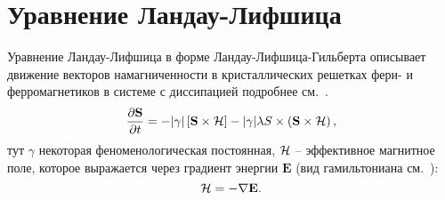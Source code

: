 \section{Уравнение Ландау-Лифшица}

Уравнение Ландау-Лифшица в форме Ландау-Лифшица-Гильберта описывает движение
векторов намагниченности в кристаллических решетках фери- и ферромагнетиков в
системе с диссипацией подробнее см.~\cite{lan-lif-again}.
\begin{equation}\label{eq:lan-lif-full}
    \frac{\partial \mathbf{S}}{\partial t} = - |\gamma|\left[\mathbf{S}\times
    \mathcal{H}\right]-
    |\gamma|\lambda S \times \left( \mathbf S \times \mathcal{H} \right),
\end{equation}
тут $\gamma$ некоторая феноменологическая постоянная,
$\mathcal{H}$ -- эффективное магнитное поле, которое выражается через градиент
энергии $\mathbf E$ (вид гамильтониана см.~\cite[с. 2]{Hagemeister2015}):
\begin{equation}
    \mathcal{H} = -\nabla \mathbf E \label{eq:heff-def}.
\end{equation}

